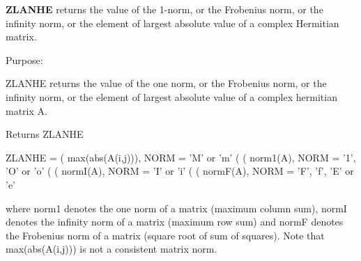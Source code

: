 {\bfseries Z\+L\+A\+N\+H\+E} returns the value of the 1-\/norm, or the Frobenius norm, or the infinity norm, or the element of largest absolute value of a complex Hermitian matrix. 

 \begin{DoxyParagraph}{Purpose\+: }
\begin{DoxyVerb} ZLANHE  returns the value of the one norm,  or the Frobenius norm, or
 the  infinity norm,  or the  element of  largest absolute value  of a
 complex hermitian matrix A.\end{DoxyVerb}

\end{DoxyParagraph}
\begin{DoxyReturn}{Returns}
Z\+L\+A\+N\+H\+E \begin{DoxyVerb}    ZLANHE = ( max(abs(A(i,j))), NORM = 'M' or 'm'
             (
             ( norm1(A),         NORM = '1', 'O' or 'o'
             (
             ( normI(A),         NORM = 'I' or 'i'
             (
             ( normF(A),         NORM = 'F', 'f', 'E' or 'e'

 where  norm1  denotes the  one norm of a matrix (maximum column sum),
 normI  denotes the  infinity norm  of a matrix  (maximum row sum) and
 normF  denotes the  Frobenius norm of a matrix (square root of sum of
 squares).  Note that  max(abs(A(i,j)))  is not a consistent matrix norm.\end{DoxyVerb}
 
\end{DoxyReturn}

